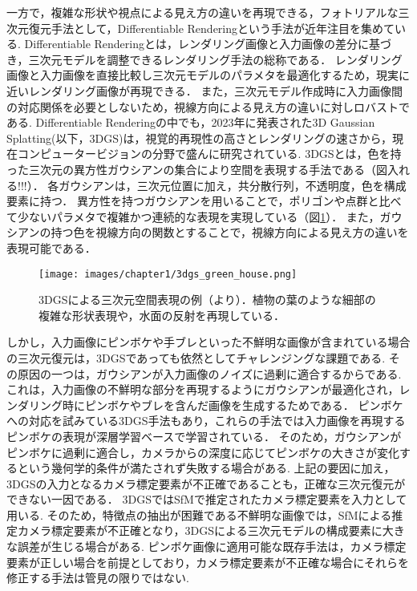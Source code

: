 一方で，複雑な形状や視点による見え方の違いを再現できる，フォトリアルな三次元復元手法として，Differentiable Renderingという手法が近年注目を集めている.
Differentiable Renderingとは，レンダリング画像と入力画像の差分に基づき，三次元モデルを調整できるレンダリング手法の総称である\cite{differentiable_rendering}．
レンダリング画像と入力画像を直接比較し三次元モデルのパラメタを最適化するため，現実に近いレンダリング画像が再現できる．
また，三次元モデル作成時に入力画像間の対応関係を必要としないため，視線方向による見え方の違いに対しロバストである.
Differentiable Renderingの中でも，2023年に発表された3D Gaussian Splatting(以下，3DGS)\cite{3dgs}は，視覚的再現性の高さとレンダリングの速さから，現在コンピュータービジョンの分野で盛んに研究されている.
3DGSとは，色を持った三次元の異方性ガウシアンの集合により空間を表現する手法である（図入れる!!!）．
各ガウシアンは，三次元位置に加え，共分散行列，不透明度，色を構成要素に持つ．
異方性を持つガウシアンを用いることで，ポリゴンや点群と比べて少ないパラメタで複雑かつ連続的な表現を実現している（図\ref{fig:green-house}）．
また，ガウシアンの持つ色を視線方向の関数とすることで，視線方向による見え方の違いを表現可能である．\par

\begin{figure}[h]
    \centering
    \texttt{[image: images/chapter1/3dgs\_green\_house.png]}
    \caption[3DGSによる三次元空間表現の例]{3DGSによる三次元空間表現の例（\cite{green-house}より）．植物の葉のような細部の複雑な形状表現や，水面の反射を再現している．}
    \label{fig:green-house}
\end{figure}

しかし，入力画像にピンボケや手ブレといった不鮮明な画像が含まれている場合の三次元復元は，3DGSであっても依然としてチャレンジングな課題である.
その原因の一つは，ガウシアンが入力画像のノイズに過剰に適合するからである.
これは，入力画像の不鮮明な部分を再現するようにガウシアンが最適化され，レンダリング時にピンボケやブレを含んだ画像を生成するためである．
ピンボケへの対応を試みている3DGS手法\cite{Deblurring3dgs}\cite{BAGS}もあり，これらの手法では入力画像を再現するピンボケの表現が深層学習ベースで学習されている．
そのため，ガウシアンがピンボケに過剰に適合し，カメラからの深度に応じてピンボケの大きさが変化するという幾何学的条件が満たされず失敗する場合がある.
上記の要因に加え，3DGSの入力となるカメラ標定要素が不正確であることも，正確な三次元復元ができない一因である．
3DGSではSfMで推定されたカメラ標定要素を入力として用いる.
そのため，特徴点の抽出が困難である不鮮明な画像では，SfMによる推定カメラ標定要素が不正確となり，3DGSによる三次元モデルの構成要素に大きな誤差が生じる場合がある.
ピンボケ画像に適用可能な既存手法は，カメラ標定要素が正しい場合を前提としており，カメラ標定要素が不正確な場合にそれらを修正する手法は管見の限りではない.\par

